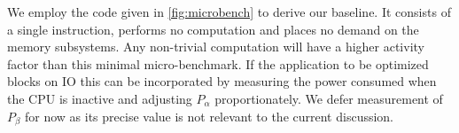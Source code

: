We employ the code given in \autoref{fig:microbench} to derive our baseline.  It consists of a single instruction, performs no computation and places no demand on the memory subsystems. Any non-trivial computation will have a higher activity factor than this minimal micro-benchmark. If the application to be optimized blocks on IO this can be incorporated by measuring the power consumed when the CPU is inactive and adjusting $P_\alpha$ proportionately. We defer measurement of $P_{\beta}$ for now as its precise value is not relevant to the current discussion. 



